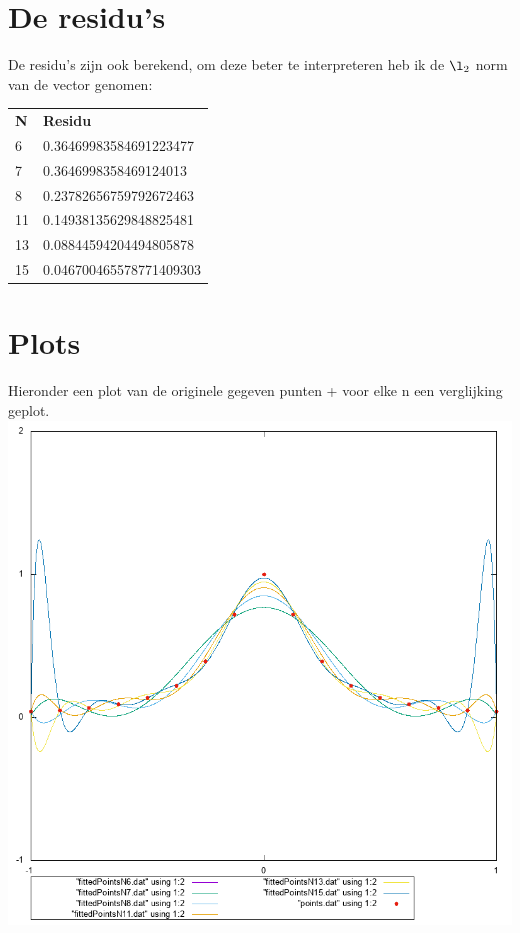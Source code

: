 \documentclass[10pt,a4paper]{article}
\begin{document}
\section{De residu's}
De residu's zijn ook berekend, om deze beter te interpreteren heb ik de $\l_{2}$ norm van de vector genomen:
\newline
\begin{center}
\begin{tabular}{ll}
\textbf{N} & \textbf{Residu}         \\
6          & 0.36469983584691223477  \\
7          & 0.3646998358469124013   \\
8          & 0.23782656759792672463  \\
11         & 0.14938135629848825481  \\
13         & 0.08844594204494805878  \\
15         & 0.046700465578771409303
\end{tabular}
\end{center}
\section{Plots}
Hieronder een plot van de originele gegeven punten + voor elke n een verglijking geplot.
\newline
\includegraphics[scale=0.6]{fit}
\end{document}

